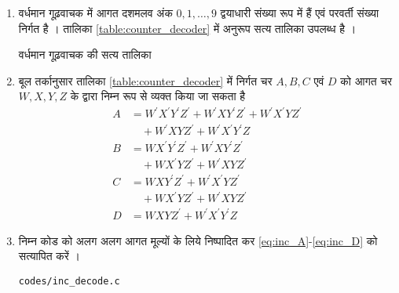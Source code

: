 \renewcommand{\theequation}{\theenumi}
\renewcommand{\thefigure}{\theenumi}
\begin{enumerate}[label=\thesection.\arabic*.,ref=\thesection.\theenumi]

\item वर्धमान गूढ़वाचक में आगत  दशमलव अंक  $0,1,\dots,9$  द्वयाधारी संख्या रूप में हैं एवं  परवर्ती संख्या निर्गत है । तालिका \ref{table:counter_decoder} में अनुरूप सत्य तालिका  उपलब्ध है
।
\begin{table}[!h]
\centering

\caption{वर्धमान गूढ़वाचक की सत्य तालिका  }
\label{table:counter_decoder}
\end{table}
\item बूल तर्कानुसार तालिका \ref{table:counter_decoder} में निर्गत चर $A, B, C$ एवं $D$  को आगत चर $W,X,Y,Z$ के द्वारा  निम्न रूप से व्यक्त किया जा सकता है
%
\begin{align}
\label{eq:inc_A}
A &= W^{\prime}X^{\prime}Y^{\prime}Z^{\prime} + W^{\prime}XY^{\prime}Z^{\prime}
+W^{\prime}X^{\prime}YZ^{\prime}
\nonumber \\
 & \quad +W^{\prime}XYZ^{\prime}
+W^{\prime}X^{\prime}Y^{\prime}Z
\\
\label{eq:inc_B}
B &= WX^{\prime}Y^{\prime}Z^{\prime} + W^{\prime}XY^{\prime}Z^{\prime}
\nonumber \\ 
& \quad 
+WX^{\prime}YZ^{\prime}
+W^{\prime}XYZ^{\prime}
\\
\label{eq:inc_C}
C &= WXY^{\prime}Z^{\prime} + W^{\prime}X^{\prime}YZ^{\prime}
\nonumber \\ 
& \quad 
+WX^{\prime}YZ^{\prime}
+W^{\prime}XYZ^{\prime}
\\
D &= WXYZ^{\prime} + W^{\prime}X^{\prime}Y^{\prime}Z
\label{eq:inc_D}
\end{align}
\item निम्न कोड को अलग अलग आगत मूल्यों के लिये निष्पादित कर \eqref{eq:inc_A}-\eqref{eq:inc_D} को सत्यापित करें ।
\label{code:inc_decode}
\begin{lstlisting}
codes/inc_decode.c
\end{lstlisting}
%
%

\end{enumerate}
%
%
